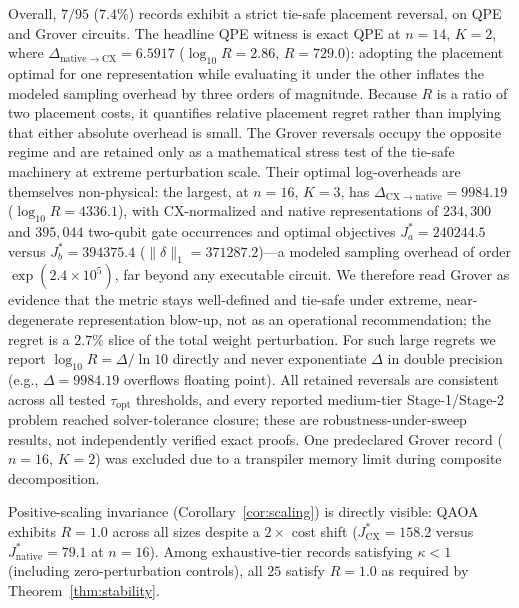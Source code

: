 \documentclass[
  aps,
  pra,
  reprint,
  amsmath,
  amssymb,
  longbibliography,
  nofootinbib,
  floatfix
]{revtex4-2}
\theoremstyle{plain}
\begin{document}
Overall, $7/95$ ($7.4\%$) records exhibit a strict tie-safe placement reversal, on QPE and Grover circuits. The headline QPE witness is exact QPE at $n=14$, $K=2$, where $\Delta_{\mathrm{native}\to\mathrm{CX}}=6.5917$ ($\log_{10}R=2.86$, $R=729.0$): adopting the placement optimal for one representation while evaluating it under the other inflates the modeled sampling overhead by three orders of magnitude. Because $R$ is a ratio of two placement costs, it quantifies relative placement regret rather than implying that either absolute overhead is small. The Grover reversals occupy the opposite regime and are retained only as a mathematical stress test of the tie-safe machinery at extreme perturbation scale. Their optimal log-overheads are themselves non-physical: the largest, at $n=16$, $K=3$, has $\Delta_{\mathrm{CX}\to\mathrm{native}}=9984.19$ ($\log_{10}R=4336.1$), with CX-normalized and native representations of $234{,}300$ and $395{,}044$ two-qubit gate occurrences and optimal objectives $J_a^*=240244.5$ versus $J_b^*=394375.4$ ($\|\delta\|_1=371287.2$)---a modeled sampling overhead of order $\exp(2.4\times10^5)$, far beyond any executable circuit. We therefore read Grover as evidence that the metric stays well-defined and tie-safe under extreme, near-degenerate representation blow-up, not as an operational recommendation; the regret is a $2.7\%$ slice of the total weight perturbation. For such large regrets we report $\log_{10}R=\Delta/\ln10$ directly and never exponentiate $\Delta$ in double precision (e.g., $\Delta=9984.19$ overflows floating point). All retained reversals are consistent across all tested $\tau_{\mathrm{opt}}$ thresholds, and every reported medium-tier Stage-1/Stage-2 problem reached solver-tolerance closure; these are robustness-under-sweep results, not independently verified exact proofs. One predeclared Grover record ($n=16$, $K=2$) was excluded due to a transpiler memory limit during composite decomposition.

Positive-scaling invariance (Corollary~\ref{cor:scaling}) is directly visible: QAOA exhibits $R=1.0$ across all sizes despite a $2\times$ cost shift ($J^*_{\mathrm{CX}}=158.2$ versus $J^*_{\mathrm{native}}=79.1$ at $n=16$). Among exhaustive-tier records satisfying $\kappa<1$ (including zero-perturbation controls), all $25$ satisfy $R=1.0$ as required by Theorem~\ref{thm:stability}.
\end{document}
